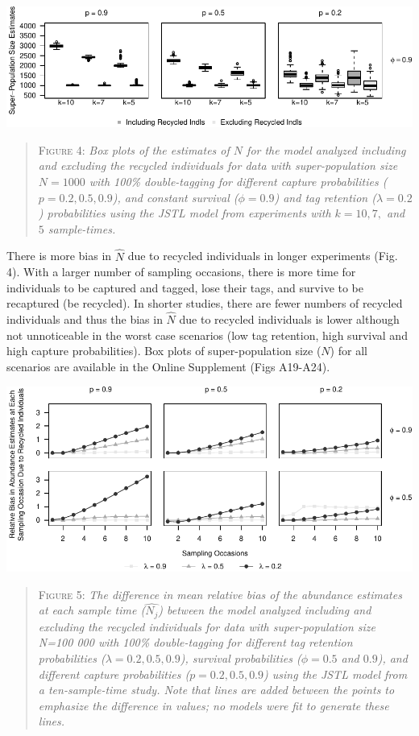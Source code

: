 \documentclass[12pt]{article}
\begin{document}
\includegraphics{RecycledPaper_files/figure-latex/Figure3_N_k-1.pdf}

\begin{quote}
\textsc{Figure 4:}
\textsl{Box plots of the estimates of $N$ for the model analyzed including and excluding the recycled individuals for data with super-population size $N=1000$ with 100\% double-tagging for different capture probabilities ($p=0.2,0.5,0.9$), and constant survival ($\phi=0.9$) and tag retention ($\lambda=0.2$) probabilities using the JSTL model from experiments with $k=10, 7,$ and $5$ sample-times. }
\end{quote}

There is more bias in \(\hat{N}\) due to recycled individuals in longer
experiments (Fig. 4). With a larger number of sampling occasions,
there is more time for individuals to be captured and tagged, lose their
tags, and survive to be recaptured (be recycled). In shorter studies,
there are fewer numbers of recycled individuals and thus the bias in
\(\hat{N}\) due to recycled individuals is lower although not
unnoticeable in the worst case scenarios (low tag retention, high
survival and high capture probabilities). Box plots of super-population
size (\(N\)) for all scenarios are available in the Online Supplement (Figs
A19-A24).

\includegraphics{RecycledPaper_files/figure-latex/Figure4_N_j-1.pdf}

\begin{quote}
\textsc{Figure 5:}
\textsl{The difference in mean relative bias of the abundance estimates at each sample time ($\hat{N_j}$) between the model analyzed including and excluding the recycled individuals for data with super-population size N=100 000 with 100\% double-tagging for different tag retention probabilities ($\lambda=0.2,0.5,0.9$), survival probabilities ($\phi=0.5$ and $0.9$), and different capture probabilities ($p=0.2,0.5,0.9$) using the JSTL model from a ten-sample-time study.  Note that lines are added between the points to emphasize the difference in values; no models were fit to generate these lines.}
\end{quote}
\end{document}
